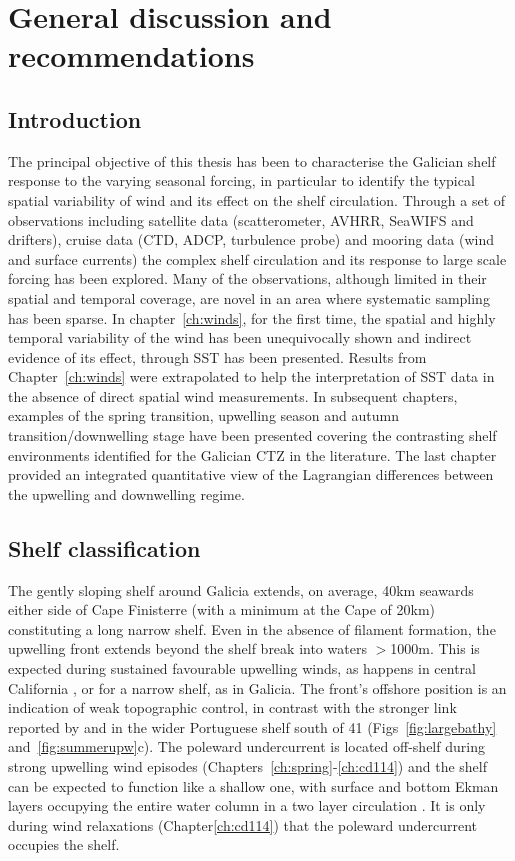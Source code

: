 \chapter{General discussion and recommendations}
\section{Introduction}

The principal objective of this thesis has been to characterise
the Galician shelf response to the varying seasonal forcing, in
particular to identify the typical spatial variability of wind and
its effect on the shelf circulation. Through a set of observations
including satellite data (scatterometer, AVHRR, SeaWIFS and
drifters), cruise data (CTD, ADCP, turbulence probe) and mooring
data (wind and surface currents) the complex shelf circulation and
its response to large scale forcing has been explored. Many of the
observations, although limited in their spatial and temporal
coverage, are novel in an area where systematic sampling has been
sparse. In chapter~\ref{ch:winds}, for the first time, the spatial
and highly temporal variability of the wind has been unequivocally
shown and indirect evidence of its effect, through SST has been
presented. Results from Chapter~\ref{ch:winds} were extrapolated
to help the interpretation of SST data in the absence of direct
spatial wind measurements. In subsequent chapters, examples of the
spring transition, upwelling season and autumn
transition/downwelling stage have been presented covering the
contrasting shelf environments identified for the Galician CTZ in
the literature. The last chapter provided an integrated
quantitative view of the Lagrangian differences between the
upwelling and downwelling regime.

\section{Shelf classification} The gently sloping shelf around
Galicia extends, on average, 40km seawards either side of Cape
Finisterre (with a minimum at the Cape of 20km) constituting a
long narrow shelf.  Even in the absence of filament formation, the
upwelling front extends beyond the shelf break into waters
$>$1000m. This is expected during sustained favourable upwelling
winds, as happens in central California \citep{Brink83}, or for a
narrow shelf, as in Galicia. The front's offshore position is an
indication of weak topographic control, in contrast with the
stronger link reported by \citet{Fiuza96b} and \citet{Peliz02} in
the wider Portuguese shelf south of 41\deg
(Figs~\ref{fig:largebathy} and~\ref{fig:summerupw}c). The poleward
undercurrent is located off-shelf during strong upwelling wind
episodes (Chapters~\ref{ch:spring}-\ref{ch:cd114}) and the shelf
can be expected to function like a shallow one, with surface and
bottom Ekman layers occupying the entire water column in a two
layer circulation \citep{Hill98}. It is only during wind
relaxations (Chapter\ref{ch:cd114}) that the poleward undercurrent
occupies the shelf.

